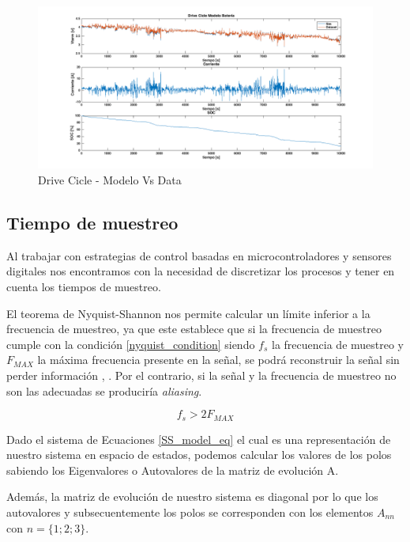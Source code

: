 \documentclass[10pt,a4paper]{article}
\begin{document}
\begin{figure}[!h]
    \centering
    \includegraphics[width=1\linewidth]{Drive_Cicle_Modelo_Bateria.png}
    \caption{Drive Cicle - Modelo Vs Data}                             
    \label{fig:DC_modVsData}                                          
\end{figure}

\subsection{Tiempo de muestreo}

Al trabajar con estrategias de control basadas en microcontroladores y sensores
digitales nos encontramos con la necesidad de discretizar los procesos y tener
en cuenta los tiempos de muestreo.

El teorema de Nyquist-Shannon nos permite calcular un límite inferior a la
frecuencia de muestreo, ya que este establece que si la frecuencia de muestreo
cumple con la condición \ref{nyquist_condition} siendo $f_s$ la frecuencia de
muestreo y $F_{MAX}$ la máxima frecuencia presente en la señal, se podrá
reconstruir la señal sin perder información \cite{Nyquist1928},
\cite{Shannon1949}.  Por el contrario, si la señal y la frecuencia de muestreo
no son las adecuadas se produciría \emph{aliasing}.

\begin{equation}
	f_s > 2 F_{MAX}
	\label{nyquist_condition}
\end{equation}

Dado el sistema de Ecuaciones \ref{SS_model_eq} el cual es una representación de
nuestro sistema en espacio de estados, podemos calcular los valores de los polos
sabiendo los Eigenvalores o Autovalores de la matriz de evolución A.

Además, la matriz de evolución de nuestro sistema es diagonal por lo que los
autovalores y subsecuentemente los polos se corresponden con los elementos
$A_{nn}$ con $n=\{1;2;3\}$.
\end{document}
